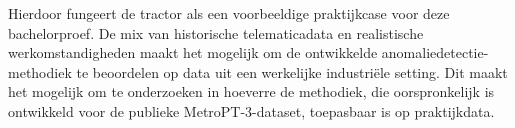 

Hierdoor fungeert de tractor als een voorbeeldige praktijkcase voor deze bachelorproef. De mix van historische telematicadata en realistische werkomstandigheden maakt het mogelijk om de ontwikkelde anomaliedetectie-methodiek te beoordelen op data uit een werkelijke industriële setting. Dit maakt het mogelijk om te onderzoeken in hoeverre de methodiek, die oorspronkelijk is ontwikkeld voor de publieke MetroPT-3-dataset, toepasbaar is op praktijkdata.



